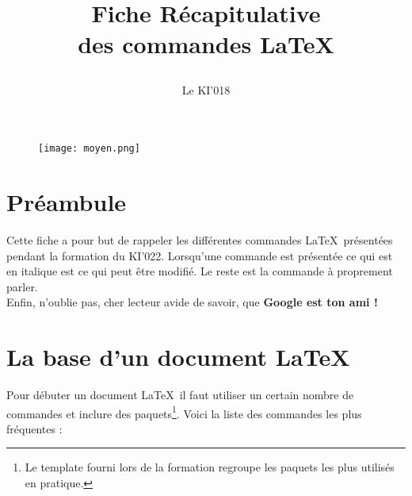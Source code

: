 \documentclass[11pt]{article}				%
\title{\textbf{Fiche Récapitulative \\ des commandes \LaTeX}
\author{Le KI'018}
\date{}
}
\begin{document}
\maketitle

\begin{figure}[h]
\begin{center}
\texttt{[image: moyen.png]}
\end{center}
\end{figure}

\section*{Préambule}

Cette fiche a pour but de rappeler les différentes commandes \LaTeX \ présentées pendant la formation du KI'022. Lorsqu'une commande est présentée ce qui est en italique est ce qui peut être modifié. Le reste est la commande à proprement parler. \\
Enfin, n'oublie pas, cher lecteur avide de savoir, que \textbf{Google est ton ami !}

\tableofcontents



\newpage



\section{La base d'un document \LaTeX}


\noindent Pour débuter un document \LaTeX \ il faut utiliser un certain nombre de commandes et inclure des paquets\footnote{Le template fourni lors de la formation regroupe les paquets les plus utilisés en pratique.}. Voici la liste des commandes les plus fréquentes : \\
\end{document}
